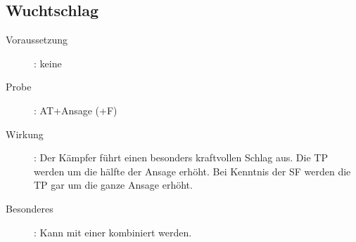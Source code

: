 \subsection{Wuchtschlag }
\label{chap.bAT.wuchtschlag}
\begin{description}
    \item[Voraussetzung]: keine
    \item[Probe]: AT+Ansage (+F)
    \item[Wirkung]: Der Kämpfer führt einen besonders kraftvollen Schlag aus.
        Die TP werden um die hälfte der Ansage erhöht.  Bei Kenntnis der SF
         werden die TP gar um die ganze Ansage erhöht.
    \item[Besonderes]: Kann mit einer  kombiniert werden.
\end{description}
